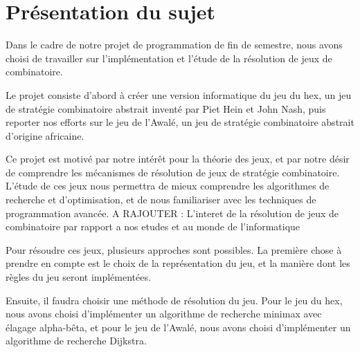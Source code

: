 \documentclass[a4paper]{article} %
\begin{document}



\newpage

\tableofcontents  %

\newpage
\section{Présentation du sujet}


Dans le cadre de notre projet de programmation de fin de semestre, nous avons 
choisi de travailler sur l'implémentation et l'étude de la résolution de jeux 
de combinatoire.

Le projet consiste d'abord à créer une version informatique du jeu du hex, un 
jeu de stratégie combinatoire abstrait inventé par Piet Hein et John Nash, puis 
reporter nos efforts sur le jeu de l'Awalé, un jeu de stratégie combinatoire 
abstrait d'origine africaine.

Ce projet est motivé par notre intérêt pour la théorie des jeux, et par notre 
désir de comprendre les mécanismes de résolution de jeux de stratégie 
combinatoire.
L'étude de ces jeux nous permettra de mieux comprendre les algorithmes de 
recherche et d'optimisation, et de nous familiariser avec les techniques de 
programmation avancée.
A RAJOUTER : L'interet de la résolution de jeux de combinatoire par rapport a 
nos etudes et au monde de l'informatique

Pour résoudre ces jeux, plusieurs approches sont possibles.
La première chose à prendre en compte est le choix de la représentation du jeu,
et la manière dont les règles du jeu seront implémentées.

Ensuite, il faudra choisir une méthode de résolution du jeu.
Pour le jeu du hex, nous avons choisi d'implémenter un algorithme de recherche 
minimax avec élagage alpha-bêta, et pour le jeu de l'Awalé, nous avons choisi 
d'implémenter un algorithme de recherche Dijkstra.
\end{document}
